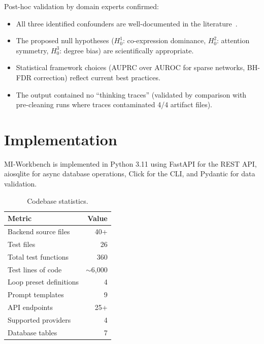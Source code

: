 \documentclass[11pt,a4paper]{article}
\begin{document}
Post-hoc validation by domain experts confirmed:
\begin{itemize}[leftmargin=*]
  \item All three identified confounders are well-documented in the literature~\citep{pratapa2020benchmarking,theodoris2023transfer}.
  \item The proposed null hypotheses ($H_0^1$: co-expression dominance, $H_0^2$: attention symmetry, $H_0^3$: degree bias) are scientifically appropriate.
  \item Statistical framework choices (AUPRC over AUROC for sparse networks, BH-FDR correction) reflect current best practices.
  \item The output contained no ``thinking traces'' (validated by comparison with pre-cleaning runs where traces contaminated 4/4 artifact files).
\end{itemize}


\section{Implementation}
\label{sec:implementation}

MI-Workbench is implemented in Python 3.11 using FastAPI for the REST API, aiosqlite for async database operations, Click for the CLI, and Pydantic for data validation.

\begin{table}[h]
\centering
\small
\caption{Codebase statistics.}
\label{tab:stats}
\begin{tabular}{@{}lr@{}}
\toprule
\textbf{Metric} & \textbf{Value} \\
\midrule
Backend source files & 40+ \\
Test files & 26 \\
Total test functions & 360 \\
Test lines of code & $\sim$6,000 \\
Loop preset definitions & 4 \\
Prompt templates & 9 \\
API endpoints & 25+ \\
Supported providers & 4 \\
Database tables & 7 \\
\bottomrule
\end{tabular}
\end{table}
\end{document}
